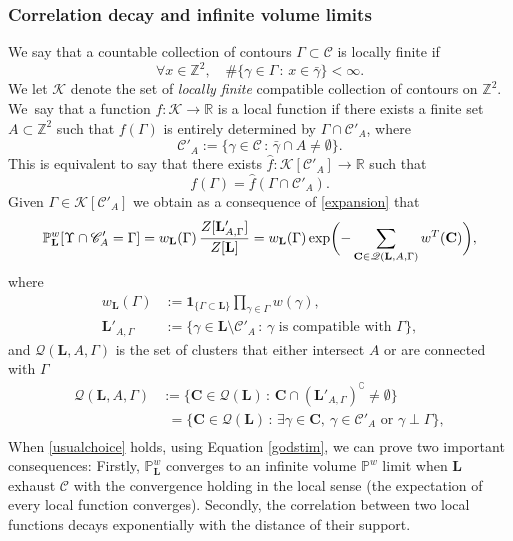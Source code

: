 \documentclass[JEP,XML,SOM,Unicode, NoFloatCountersInSection]{cedram}
\let\mathcal\mathscr
\newcommand{\sep}{\,:\,}
\numberwithin{equation}{section}
\theoremstyle{plain}
\theoremstyle{definition}
\newcommand{\ind}{\mathbf{1}}
\newcommand{\cc}{\complement}
\newcommand{\cQ}{{\ensuremath{\mathcal Q}} }
\newcommand{\cC}{{\ensuremath{\mathcal C}} }
\newcommand{\cK}{{\ensuremath{\mathcal K}} }
\newcommand{\bC}{{\ensuremath{\mathbf C}} }
\newcommand{\bL}{{\ensuremath{\mathbf L}} }
\newcommand{\bbP}{{\ensuremath{\mathbb P}} }
\newcommand{\bbR}{{\ensuremath{\mathbb R}} }
\newcommand{\bbZ}{{\ensuremath{\mathbb Z}} }
\newcommand{\gG}{\Gamma}
\begin{document}
\subsubsection{Correlation decay and infinite volume limits}\label{fffb}

We say that a countable collection of contours $\gG\subset \cC$ is locally finite if
\begin{equation}\label{locallyfinite}
\forall x\in \bbZ^2, \quad \#\{ \gamma \in \gG \sep x\in \bar \gamma\}<\infty.
\end{equation}
We let $\cK$ denote the set of \textit{locally finite} compatible collection of contours on $\bbZ^2$.
We~say that a function $f: \cK\to \bbR$ is a local function if there exists a finite set
$A \subset \bbZ^2$ such that $f(\gG)$ is entirely determined by $\gG\cap \cC'_A$,
where
\[
\cC'_A:= \{ \gamma \in \cC \sep \bar \gamma \cap A\ne \emptyset \}.
\]
This is equivalent to say that there exists
$\hat f: \cK[\cC'_A]\to \bbR$ such that
\[
f(\gG)=\hat f(\gG\cap \cC'_{A}).
\]
Given $\gG\in \cK[\cC'_{A}]$ we obtain as a consequence of \eqref{expansion} that
\begin{equation}\label{godstim}
\bbP^w_{\bL}[\Upsilon \cap \cC'_{A}=\gG]=w_{\bL}(\gG)\,\frac{Z[\bL'_{A,\gG}]}{Z[\bL]}\\
=
w_{\bL}(\gG)\exp\biggl(-\sum_{\bC\in \cQ(\bL,A,\gG)} w^T(\bC)\biggr),
\end{equation}
where\vspace*{-3pt}
\begin{equation*}\begin{split}
w_\bL(\gG)&:=\ind_{\{\gG\subset \bL\}}\prod_{\gamma\in \gG}w(\gamma),\\
\bL'_{A,\gG}&:=\{ \gamma \in \bL \setminus \cC'_A \sep \gamma \text{ is compatible with } \gG\},
\end{split}
\end{equation*}
and $\cQ(\bL,A,\gG)$ is the set of clusters that either intersect $A$ or are connected with $\gG$
\begin{equation*}
\begin{split}
\cQ(\bL,A,\gG)&:= \{\bC\in \cQ(\bL) \sep \bC\cap (\bL'_{A,\gG})^\cc\ne \emptyset \}\\
&\phantom{:}=\{\bC\in \cQ(\bL) \sep \exists \gamma\in \bC, \ \gamma\in \cC'_A \text{ or } \gamma \perp \gG \},\\
\end{split}
\end{equation*}
When \eqref{usualchoice} holds, using Equation \eqref{godstim},
we can prove two important consequences: Firstly, $\bbP^w_{\bL}$ converges to an infinite volume $\bbP^w$ limit when
$\bL$ exhaust $\cC$ with the convergence holding in the local sense (the expectation of every local function converges).
Secondly, the correlation between two local functions decays exponentially with the distance of their support.
\end{document}
